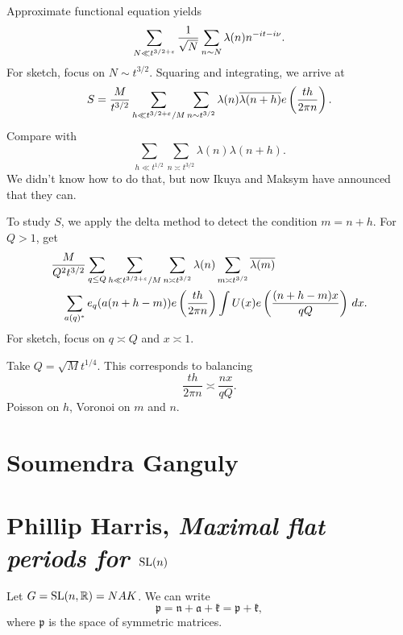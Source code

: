 \documentclass[reqno]{amsart} 
\begin{document}
Approximate functional equation yields
\begin{equation*}
  \sum_{N \ll t^{3/2 + \varepsilon }} \frac{1}{ \sqrt{N}}
  \sum_{n \sim N } \lambda (n ) n^{- i t - i \nu }.
\end{equation*}
For sketch, focus on $N \sim t^{3/2}$.  Squaring and integrating, we arrive at
\begin{equation*}
  S = \frac{M}{ t^{3/2} }
  \sum_{h \ll t^{3/2 + \varepsilon } / M}
  \sum_{n \sim t^{3/2} }
  \lambda (n) \overline{\lambda (n + h)}
  e \left( \frac{t h}{2 \pi n} \right).
\end{equation*}
Compare with
\begin{equation*}
  \sum_{h \ll t^{1/2} }
  \sum_{n \asymp t^{3/2} }
  \lambda (n ) \lambda (n + h).
\end{equation*}
We didn't know how to do that, but now Ikuya and Maksym have announced that they can.

To study $S$, we apply the delta method to detect the condition $m = n + h$.  For $Q > 1$, get
\begin{align*}
  &\frac{M}{Q^2 t^{3/2} } \sum_{q \leq Q} \sum_{h \ll t^{3 / 2 + \varepsilon } / M }
  \sum_{n \asymp t^{3/2} } \lambda (n )
  \sum_{m \asymp t^{3/2} } \overline{\lambda  (m)} \\
  &\quad \sum_{a(q)^*}
  e_q (a (n + h - m))
  e \left( \frac{t h }{ 2 \pi n } \right)
\int U (x) e \left( \frac{(n + h - m )x}{q Q} \right) \, d x.  
\end{align*}
For sketch, focus on $q \asymp Q$ and $x \asymp 1$.

Take $Q = \sqrt{M } t^{1/4} $.  This corresponds to balancing
\begin{equation*}
  \frac{t h }{2 \pi n}
  \asymp \frac{n x}{q Q}.
\end{equation*}
Poisson on $h$, Voronoi on $m$ and $n$.



\section{Soumendra Ganguly}



\section{Phillip Harris, \emph{Maximal flat periods for $\operatorname{SL}(n)$}}
Let $G = \operatorname{SL}(n,\mathbb{R}) = N A K$.  We can write
\begin{equation*}
  \mathfrak{p} = \mathfrak{n} + \mathfrak{a} + \mathfrak{k} = \mathfrak{p} + \mathfrak{k} ,
\end{equation*}
where $\mathfrak{p}$ is the space of symmetric matrices.
\end{document}
